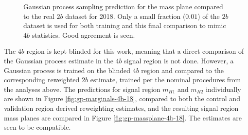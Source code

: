 \begin{figure}[ht]
	\centering

	\caption{\label{fig:gp-massplane-18} Gaussian process sampling prediction for the mass plane compared to the real 
	$2b$ dataset for 2018. Only a small fraction ($0.01$) of the $2b$ dataset is used for both training and this final 
	comparison to mimic $4b$ statistics. Good agreement is seen.}
\end{figure}

The $4b$ region is kept blinded for this work, meaning that a direct comparison of the Gaussian process 
estimate in the $4b$ signal region is not done. However, a Gaussian process is trained on the blinded $4b$ 
region and compared to the corresponding reweighted $2b$ estimate, trained per the nominal procedures from
the analyses above. The predictions for signal region $m_{H1}$ and $m_{H2}$ individually are shown in 
Figure \ref{fig:gp-marginals-4b-18}, compared to both the control and validation region derived reweighting estimates,
and the resulting signal region mass planes are compared in Figure \ref{fig:gp-massplane-4b-18}. The 
estimates are seen to be compatible.

